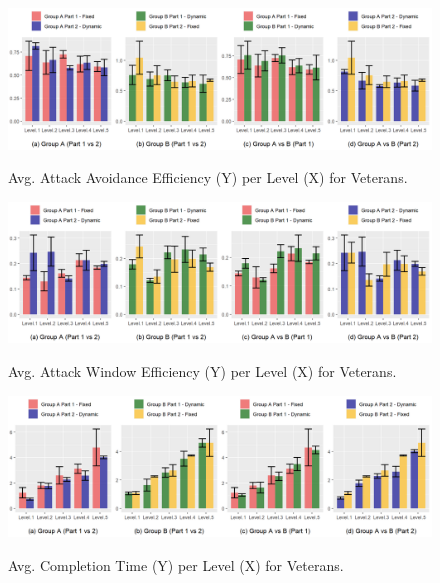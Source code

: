 \begin{figure}[!ht]
    \begin{center}
        \caption{Avg. Attack Avoidance Efficiency (Y) per Level (X) for Veterans.}
        \includegraphics[width=\textwidth]{figures/attack_avoidance_efficiency-veteran_players.png}
    \label{fig:result-metric-veterans-attack-avoidance-efficiency}
    \end{center}
\end{figure}

\begin{figure}[!ht]
    \begin{center}
    \caption{Avg. Attack Window Efficiency (Y) per Level (X) for Veterans.}
        \includegraphics[width=\textwidth]{figures/attack_window_efficiency-veteran_players.png}
    \label{fig:result-metric-veterans-attack-window-efficiency}
    \end{center}
\end{figure}

\begin{figure}[!ht]
    \begin{center}
    \caption{Avg. Completion Time (Y) per Level (X) for Veterans.}
        \includegraphics[width=\textwidth]{figures/completion_time-veteran_players.png}
        \label{fig:result-metric-veterans-completion-time}
    \end{center}
\end{figure}

